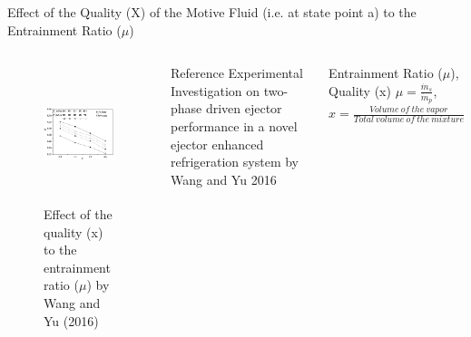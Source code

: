 \begin{frame}{Effect of the Quality (X) of the Motive Fluid (i.e. at state point a) to the Entrainment Ratio ($\mu$)\cite{wang2016experimental}}
\begin{columns}
    \begin{figure}[h]
      \centering
      \includegraphics[height=4cm]{images/partialevapmu.png}
      \caption{\scriptsize \centering Effect of the quality (x) to the entrainment ratio ($\mu$) by Wang and Yu (2016) \cite{wang2016experimental}}
   \end{figure}
    \begin{block}{Reference}
     Experimental Investigation on two-phase driven ejector performance in a novel ejector enhanced refrigeration system by Wang and Yu 2016 \cite{wang2016experimental}
    \end{block}
    \begin{block}{Entrainment Ratio ($\mu$), Quality (x)}
     $\mu = \frac{\Dot m_{s}}{\Dot m_{p}}$, \: $x = \frac{Volume\:of\:the\:vapor}{Total\:volume\:of \:the\:mixture}$
    \end{block}
\end{columns}
\end{frame}

